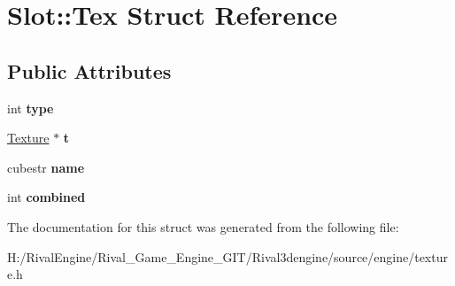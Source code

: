 \hypertarget{struct_slot_1_1_tex}{}\section{Slot\+:\+:Tex Struct Reference}
\label{struct_slot_1_1_tex}
\subsection*{Public Attributes}
\begin{DoxyCompactItemize}
\item 
\mbox{\label{struct_slot_1_1_tex_a27eb4fcd1dd5f6e66dd15e8482212700}} 
int {\bfseries type}
\item 
\mbox{\label{struct_slot_1_1_tex_a01db95cbf22e4f6034981d595145c3a7}} 
\hyperlink{struct_texture}{Texture} $\ast$ {\bfseries t}
\item 
\mbox{\label{struct_slot_1_1_tex_a26981966070bdae6653e6e99ddb13b55}} 
cubestr {\bfseries name}
\item 
\mbox{\label{struct_slot_1_1_tex_a30f4386231d2263c8d01cf6bc001495f}} 
int {\bfseries combined}
\end{DoxyCompactItemize}


The documentation for this struct was generated from the following file\+:\begin{DoxyCompactItemize}
\item 
H\+:/\+Rival\+Engine/\+Rival\+\_\+\+Game\+\_\+\+Engine\+\_\+\+G\+I\+T/\+Rival3dengine/source/engine/texture.\+h\end{DoxyCompactItemize}
